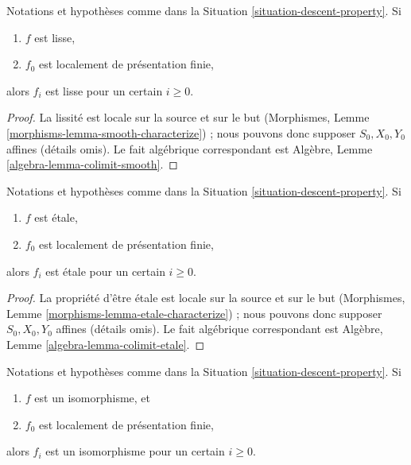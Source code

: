\begin{lemma}
\label{lemma-descend-smooth}
Notations et hypothèses comme dans la
Situation \ref{situation-descent-property}. Si
\begin{enumerate}
\item $f$ est lisse,
\item $f_0$ est localement de présentation finie,
\end{enumerate}
alors $f_i$ est lisse pour un certain $i \geq 0$.
\end{lemma}

\begin{proof}
La lissité est locale sur la source et sur le but (Morphismes,
Lemme \ref{morphisms-lemma-smooth-characterize}) ; nous pouvons donc supposer
$S_0, X_0, Y_0$ affines (détails omis). Le fait algébrique correspondant
est Algèbre, Lemme \ref{algebra-lemma-colimit-smooth}.
\end{proof}

\begin{lemma}
\label{lemma-descend-etale}
Notations et hypothèses comme dans la
Situation \ref{situation-descent-property}. Si
\begin{enumerate}
\item $f$ est étale,
\item $f_0$ est localement de présentation finie,
\end{enumerate}
alors $f_i$ est étale pour un certain $i \geq 0$.
\end{lemma}

\begin{proof}
La propriété d'être étale est locale sur la source et sur le but (Morphismes,
Lemme \ref{morphisms-lemma-etale-characterize}) ; nous pouvons donc supposer
$S_0, X_0, Y_0$ affines (détails omis). Le fait algébrique correspondant
est Algèbre, Lemme \ref{algebra-lemma-colimit-etale}.
\end{proof}

\begin{lemma}
\label{lemma-descend-isomorphism}
Notations et hypothèses comme dans la
Situation \ref{situation-descent-property}. Si
\begin{enumerate}
\item $f$ est un isomorphisme, et
\item $f_0$ est localement de présentation finie,
\end{enumerate}
alors $f_i$ est un isomorphisme pour un certain $i \geq 0$.
\end{lemma}

